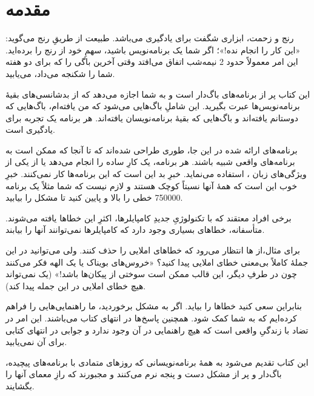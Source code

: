 \section*{مقدمه}
رنج و زحمت، ابزاری شگفت برای یادگیری می‌باشد. طبیعت از طریقِ رنج می‌گوید: «این کار را انجام نده!»؛ اگر شما یک برنامه‌نویس باشید، سهمِ خود از رنج را برده‌اید. این امر معمولاً حدود 2 نیمه‌شب اتفاق می‌افتد وقتی آخرین باگی را که برای دو هفته شما را شکنجه می‌داد، می‌یابید.

این کتاب پر از برنامه‌های باگ‌دار است و به شما اجازه می‌دهد که از بدشانسی‌های بقیهٔ برنامه‌نویس‌ها عبرت بگیرید. این شاملِ باگ‌هایی می‌شود که من یافته‌ام، باگ‌هایی که دوستانم یافته‌اند و باگ‌هایی که بقیهٔ برنامه‌نویسان یافته‌اند. هر برنامه یک تجربه برای یادگیری است.

برنامه‌های ارائه شده در این جا، طوری طراحی شده‌اند که تا آنجا که ممکن است به برنامه‌های واقعی شبیه باشند. هر برنامه، یک کارِ ساده را انجام می‌دهد یا از یکی از ویژگی‌های زبان ، استفاده می‌نماید. خبرِ بد این است که این برنامه‌ها کار نمی‌کنند. خبرِ خوب این است که همهٔ آنها نسبتاً کوچک هستند و لازم نیست که شما مثلاً یک برنامه 750000 خطی را بالا و پایین کنید تا مشکل را بیابید.

برخی افراد معتقند که با تکنولوژیِ جدیدِ کامپایلرها، اکثرِ این خطاها یافته می‌شوند. متأسفانه، خطاهای بسیاری وجود دارد که کامپایلرها نمی‌توانند آنها را بیابند.

برای مثال،از ها انتظار می‌رود که خطاهای املایی را حذف کنند. ولی می‌توانید در این جملهٔ کاملاً بی‌معنی خطای املایی پیدا کنید؟ «خروس‌های بویناک یا یک الهه فکر می‌کنند چون در طرفِ دیگر، این قالب ممکن است سوختی از پیکان‌ها باشد!» (یک  نمی‌تواند هیچ خطای املایی در این جمله پیدا کند).

بنابراین سعی کنید خطاها را بیاید. اگر به مشکل برخوردید، ما راهنمایی‌هایی را فراهم کرده‌ایم که به شما کمک شود. همچنین پاسخ‌ها در انتهای کتاب می‌باشند. این امر در تضاد با زندگیِ واقعی است که هیچ راهنمایی در آن وجود ندارد و جوابی در انتهای کتابی برای آن نمی‌یابید.

این کتاب تقدیم می‌شود به همهٔ برنامه‌نویسانی که روزهای متمادی با برنامه‌های پیچیده، باگ‌دار و پر از مشکل دست و پنجه نرم می‌کنند و مجبورند که رازِ معمای آنها را بگشایند.
